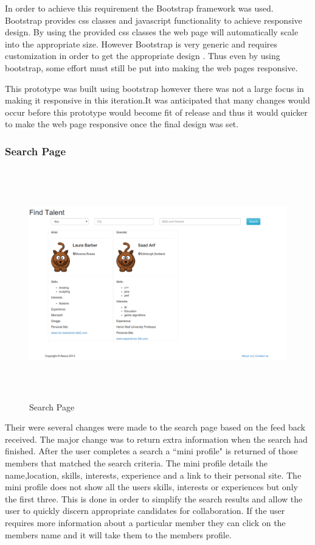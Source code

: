 \documentclass[a4paper,oneside,11pt]{report}
\begin{document}
In order to achieve this requirement the Bootstrap framework was used. Bootstrap provides css classes and javascript functionality to achieve responsive design. By using the provided css classes the web page will automatically scale into the appropriate size. However Bootstrap is very generic and requires customization in order to get the appropriate design . Thus even by using bootstrap, some effort must still be put into making the web pages responsive.

This prototype was built using bootstrap however there was not a large focus in making it responsive in this iteration.It was anticipated that many changes would occur before this prototype would become fit of release and thus it would quicker to make the web page responsive once the final design was set.

\subsubsection{Search Page}
\begin{figure}[!ht]
\centering
\includegraphics[width=\textwidth,height=10cm]{search-second-iteration.png}
\caption{Search Page}
\end{figure}
Their were several changes were made to the search page based on the feed back received. The major change was to return extra information when the search had finished. After the user completes a search a ``mini profile" is returned of those members that matched the search criteria. The mini profile details the name,location, skills, interests, experience and a link to their personal site. The mini profile does not show all the users skills, interests or experiences but only the first three. This is done in order to simplify the search results and allow the user to quickly discern appropriate candidates for collaboration. If the user requires more information about a particular member they can click on the members name and it will take them to the members profile. 
\end{document}
